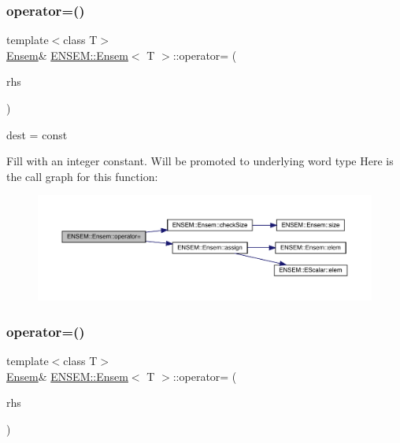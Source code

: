 \subsubsection{\texorpdfstring{operator=()}{operator=()}\hspace{0.1cm}{\footnotesize\ttfamily [3/15]}}
{\footnotesize\ttfamily template$<$class T$>$ \\
\mbox{\hyperlink{classENSEM_1_1Ensem}{Ensem}}\& \mbox{\hyperlink{classENSEM_1_1Ensem}{E\+N\+S\+E\+M\+::\+Ensem}}$<$ T $>$\+::operator= (\begin{DoxyParamCaption}\item[{const typename \mbox{\hyperlink{structENSEM_1_1WordType}{Word\+Type}}$<$ T $>$\+::Type\+\_\+t \&}]{rhs }\end{DoxyParamCaption})\hspace{0.3cm}{\ttfamily [inline]}}



dest = const 

Fill with an integer constant. Will be promoted to underlying word type Here is the call graph for this function\+:
\nopagebreak
\begin{figure}[H]
\begin{center}
\leavevmode
\includegraphics[width=350pt]{d7/d3e/classENSEM_1_1Ensem_a1331b77ba6b10ddefa983e39976b4db6_cgraph}
\end{center}
\end{figure}
\mbox{\label{classENSEM_1_1Ensem_a55913bc59bca1022f5189cbc86632c11}} 
\subsubsection{\texorpdfstring{operator=()}{operator=()}\hspace{0.1cm}{\footnotesize\ttfamily [4/15]}}
{\footnotesize\ttfamily template$<$class T$>$ \\
\mbox{\hyperlink{classENSEM_1_1Ensem}{Ensem}}\& \mbox{\hyperlink{classENSEM_1_1Ensem}{E\+N\+S\+E\+M\+::\+Ensem}}$<$ T $>$\+::operator= (\begin{DoxyParamCaption}\item[{const \mbox{\hyperlink{structENSEM_1_1Zero}{Zero}} \&}]{rhs }\end{DoxyParamCaption})\hspace{0.3cm}{\ttfamily [inline]}}



